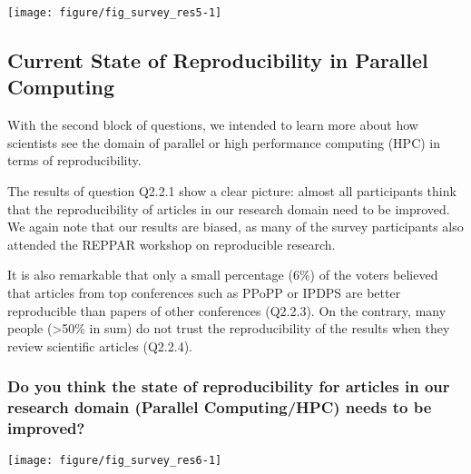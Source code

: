 \documentclass{article}\usepackage[]{graphicx}\usepackage[]{color}
\newenvironment{knitrout}{}{}
\newcommand{\reppar}{REPPAR\xspace}
\newcommand{\ques}[2]{Q2.#1.#2\xspace}
\begin{document}
\begin{knitrout}
\color{fgcolor}

{\centering \texttt{[image: figure/fig\_survey\_res5-1]} 

}



\end{knitrout}



\subsection{Current State of Reproducibility in Parallel Computing}
\label{sec:current_state}

With the second block of questions, we intended to learn more about
how scientists see the domain of parallel or high performance
computing (HPC) in terms of reproducibility.

The results of question \ques{2}{1} show a clear picture: almost all
participants think that the reproducibility of articles in our
research domain need to be improved. We again note that our results
are biased, as many of the survey participants also attended the
\reppar workshop on reproducible research.

It is also remarkable that only a small percentage (6\%) of the voters
believed that articles from top conferences such as PPoPP or IPDPS are
better reproducible than papers of other conferences (\ques{2}{3}).
On the contrary, many people (>50\% in sum) do not trust the
reproducibility of the results when they review scientific articles
(\ques{2}{4}).

\newpage



\subsubsection{Do you think the state of reproducibility for articles in our research domain (Parallel Computing/HPC) needs to be improved?}

\begin{knitrout}
\color{fgcolor}

{\centering \texttt{[image: figure/fig\_survey\_res6-1]} 

}



\end{knitrout}
\end{document}
